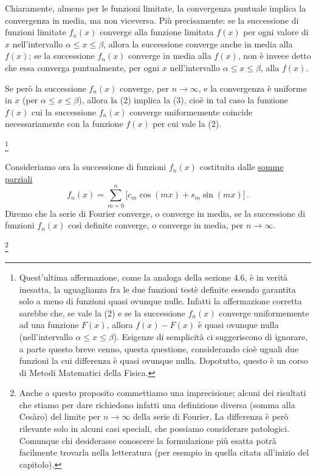 \documentclass[11pt, a4paper]{book}
\numberwithin{equation}{section}
\begin{document}
Chiaramente, almeno per le funzioni limitate, la convergenza puntuale implica la convergenza in media, ma non viceversa. Più precisamente: se la successione di funzioni limitate $f_n(x)$ converge alla funzione limitata $f(x)$ per ogni valore di $x$ nell'intervallo $\alpha \leq x \leq \beta$, allora la successione converge anche in media alla $f(x)$; se la successione $f_n(x)$ converge in media alla $f(x)$, non è invece detto che essa converga puntualmente, per ogni $x$ nell'intervallo $\alpha \leq x \leq \beta$, alla $f(x)$.

Se però la successione $f_n(x)$ converge, per $n\to\infty$, e la convergenza è uniforme in $x$ (per $\alpha \leq x \leq \beta$), allora la (2) implica la (3), cioè in tal caso la funzione $f(x)$ cui la successione $f_n(x)$ converge uniformemente coincide necessariamente con la funzione $f(x)$ per cui vale la (2).

\footnote{Quest'ultima affermazione, come la analoga della sezione 4.6, è in verità inesatta, la uguaglianza fra le due funzioni testè definite essendo garantita solo a meno di funzioni quasi ovunque nulle. Infatti la affermazione corretta sarebbe che, se vale la (2) e se la successione $f_n(x)$ converge uniformemente ad una funzione $F(x)$, allora $f(x)-F(x)$ è quasi ovunque nulla (nell'intervallo $\alpha \leq x \leq \beta$). Esigenze di semplicità ci suggeriscono di ignorare, a parte questo breve cenno, questa questione, considerando cioè uguali due funzioni la cui differenza è quasi ovunque nulla. Dopotutto, questo è un corso di Metodi Matematici della Fisica.}

Consideriamo ora la successione di funzioni $f_n(x)$ costituita dalle \uline{somme parziali}
\begin{equation}
  f_n(x) = \sum_{m=0}^{n}\bigl[c_m\cos(mx)+s_m\sin(mx)\bigr]\,. \tag{4}
\end{equation}
Diremo che la serie di Fourier converge, o converge in media, se la successione di funzioni $f_n(x)$ così definite converge, o converge in media, per $n\to\infty$.

\footnote{Anche a questo proposito commettiamo una imprecisione; alcuni dei risultati che stiamo per dare richiedono infatti una definizione diversa (somma alla Cesàro) del limite per $n\to\infty$ della serie di Fourier. La differenza è però rilevante solo in alcuni casi speciali, che possiamo considerare patologici. Comunque chi desiderasse conoscere la formulazione più esatta potrà facilmente trovarla nella letteratura (per esempio in quella citata all'inizio del capitolo).}
\end{document}
